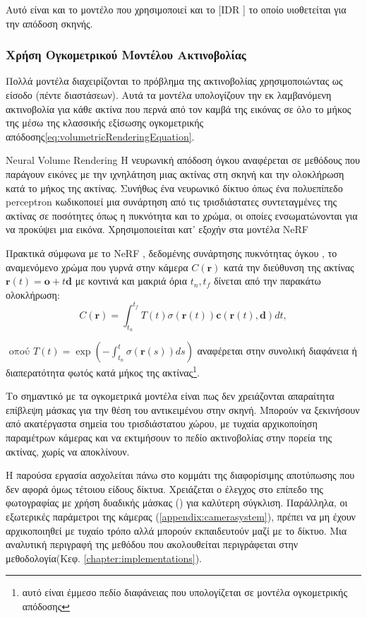 Αυτό είναι και το μοντέλο που χρησιμοποιεί και το  [IDR \cite{yariv2020multiview}] το οποίο υιοθετείται για την απόδοση σκηνής.
\subsubsection{Χρήση Ογκομετρικού Μοντέλου Ακτινοβολίας  \cite{mildenhall2020nerf}}
Πολλά μοντέλα διαχειρίζονται το πρόβλημα της ακτινοβολίας χρησιμοποιώντας ως είσοδο  (πέντε διαστάσεων). Αυτά τα μοντέλα υπολογίζουν την εκ λαμβανόμενη ακτινοβολία  για κάθε ακτίνα που περνά από τον καμβά της εικόνας σε όλο το μήκος της μέσω της κλασσικής εξίσωσης ογκομετρικής απόδοσης\ref{eq:volumetricRenderingEquation}.
\begin{definition} Νeural Volume Rendering
    Η νευρωνική απόδοση όγκου αναφέρεται σε μεθόδους που παράγουν εικόνες με την ιχνηλάτηση μιας ακτίνας στη σκηνή και την ολοκλήρωση κατά το μήκος της ακτίνας. Συνήθως ένα νευρωνικό δίκτυο όπως ένα πολυεπίπεδο perceptron κωδικοποιεί μια συνάρτηση από τις τρισδιάστατες συντεταγμένες της ακτίνας σε ποσότητες όπως η πυκνότητα και το χρώμα, οι οποίες ενσωματώνονται για να προκύψει μια εικόνα. Χρησιμοποιείται κατ' εξοχήν στα μοντέλα NeRF
\end{definition}
Πρακτικά σύμφωνα με το NeRF \cite{mildenhall2020nerf}, δεδομένης συνάρτησης πυκνότητας όγκου , το αναμενόμενο χρώμα που γυρνά στην κάμερα $C(\textbf{r})$ κατά την διεύθυνση της ακτίνας $\textbf{r}(t) = \textbf{o} + t\textbf{d}$ με κοντινά και μακριά όρια $t_n,t_f$ δίνεται από την παρακάτω ολοκλήρωση:
\begin{equation}
    C(\mathbf{r})=\int_{t_n}^{t_f} T(t) \sigma(\mathbf{r}(t)) \mathbf{c}(\mathbf{r}(t), \mathbf{d}) d t,
    \label{eq:volumetricRenderingEquation}
\end{equation}
 
$\text { οπού } T(t)=\exp \left(-\int_{t_n}^t \sigma(\mathbf{r}(s)) d s\right)$ αναφέρεται στην συνολική διαφάνεια ή διαπερατότητα φωτός κατά μήκος της ακτίνας\footnote{αυτό είναι έμμεσο πεδίο διαφάνειας που υπολογίζεται σε μοντέλα ογκομετρικής απόδοσης}.

Το σημαντικό με τα ογκομετρικά μοντέλα είναι πως δεν χρειάζονται απαραίτητα επίβλεψη μάσκας για την θέση του αντικειμένου στην σκηνή.  Μπορούν να ξεκινήσουν από ακατέργαστα σημεία του τρισδιάστατου χώρου, με τυχαία αρχικοποίηση παραμέτρων κάμερας και να εκτιμήσουν το πεδίο ακτινοβολίας στην πορεία της ακτίνας, χωρίς να αποκλίνουν.

Η παρούσα εργασία ασχολείται πάνω στο κομμάτι της διαφορίσιμης αποτύπωσης που δεν αφορά όμως τέτοιου είδους δίκτυα. Χρειάζεται ο έλεγχος στο επίπεδο της φωτογραφίας με χρήση δυαδικής μάσκας () για καλύτερη σύγκλιση. Παράλληλα, οι εξωτερικές παράμετροι της κάμερας (\ref{appendix:camerasystem}), πρέπει να μη έχουν αρχικοποιηθεί με τυχαίο τρόπο αλλά μπορούν εκπαιδευτούν μαζί με το δίκτυο. Μια αναλυτική περιγραφή της μεθόδου που ακολουθείται περιγράφεται στην μεθοδολογία(Κεφ. \ref{chapter:implementations}).
\clearpage